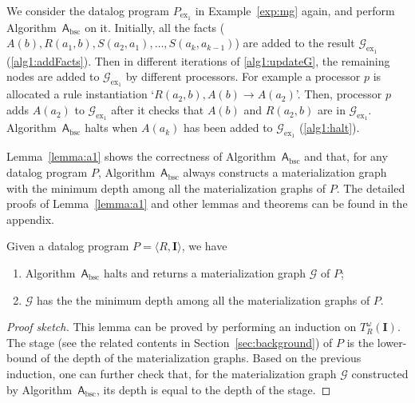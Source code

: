 \begin{example}
We consider the datalog program $P_{\text{ex}_1}$ in Example~\ref{exp:mg} again,
and perform Algorithm~$\mathsf{A}_{\text{bsc}}$ on it.
Initially, all the facts ($A(b),R(a_1,b),S(a_2,a_1),\ldots,S(a_{k},a_{k-1})$) are added to the
result $\mathcal{G}_{\text{ex}_1}$ (\ref{alg1:addFacts}).
Then in different iterations of \ref{alg1:updateG}, the remaining nodes are added to
$\mathcal{G}_{\text{ex}_1}$ by different processors.
For example a processor $p$ is allocated a rule instantiation `$R(a_2,b),A(b)\rightarrow A(a_2)$'.
Then, processor $p$ adds $A(a_2)$ to $\mathcal{G}_{\text{ex}_1}$ after it checks that
$A(b)$ and $R(a_2,b)$ are in $\mathcal{G}_{\text{ex}_1}$.
Algorithm~$\mathsf{A}_{\text{bsc}}$ halts when $A(a_k)$ has been added to $\mathcal{G}_{\text{ex}_1}$ (\ref{alg1:halt}).
\end{example}

Lemma~\ref{lemma:a1} shows the correctness of Algorithm~$\mathsf{A}_{\text{bsc}}$ and that, for any datalog program $P$,
Algorithm~$\mathsf{A}_{\text{bsc}}$ always constructs a materialization graph with the minimum depth among all the
materialization graphs of $P$. The detailed proofs of Lemma~\ref{lemma:a1} and other lemmas and theorems can be found
in the appendix.

\begin{lemma}
\label{lemma:a1}
Given a datalog program $P=\langle R, \textbf{I}\rangle$, we have
\begin{enumerate}[leftmargin=4ex]
\item Algorithm~$\mathsf{A}_{\text{bsc}}$ halts and returns a materialization graph $\mathcal{G}$ of $P$;
\item $\mathcal{G}$ has the the minimum depth among all the materialization graphs of $P$.
\end{enumerate}
\end{lemma}

\begin{proof}[Proof sketch] This lemma can be proved by performing
an induction on $T_R^{\omega}(\textbf{I})$.
The stage (see the related contents in Section~\ref{sec:background}) of $P$
is the lower-bound of the depth of the materialization graphs. Based on the previous induction,
one can further check that, for the materialization graph $\mathcal{G}$ constructed by Algorithm~$\mathsf{A}_{\text{bsc}}$,
its depth is equal to the depth of the stage.
\end{proof}

